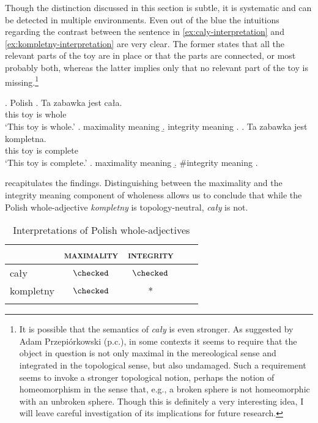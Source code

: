 Though the distinction discussed in this section is subtle, it is systematic and can be detected in multiple environments. Even out of the blue the intuitions regarding the contrast between the sentence in \ref{ex:caly-interpretation} and \ref{ex:kompletny-interpretation} are very clear. The former states that all the relevant parts of the toy are in place or that the parts are connected, or most probably both, whereas the latter implies only that no relevant part of the toy is missing.\footnote{It is possible that the semantics of \textit{cały} is even stronger. As suggested by Adam Przepiórkowski (p.c.), in some contexts it seems to require that the object in question is not only maximal in the mereological sense and integrated in the topological sense, but also undamaged. Such a requirement seems to invoke a stronger topological notion, perhaps the notion of homeomorphism in the sense that, e.g., a broken sphere is not homeomorphic with an unbroken sphere. Though this is definitely a very interesting idea, I will leave careful investigation of its implications for future research.}\largerpage
		
		\ex. Polish\label{ex:caly-kompletny-interpretation}
        \ag. Ta zabawka jest cała.\label{ex:caly-interpretation}\\
		this toy is whole\\
		`This toy is whole.'
		\a. maximality meaning
		\b. integrity meaning
		\z.
		\bg. Ta zabawka jest kompletna.\label{ex:kompletny-interpretation}\\
		this toy is complete\\
		`This toy is complete.'
		\a. maximality meaning
		\b. \#integrity meaning
        \z.

 recapitulates the findings. Distinguishing between the maximality and the integrity meaning component of wholeness allows us to conclude that while the Polish whole-adjective \textit{kompletny} is topology-neutral, \textit{cały} is not.  

		\begin{table}[h]
			\centering
			\begin{tabular}{lcccc}
				\lsptoprule
				& \textsc{maximality} & \textsc{integrity} \\ \midrule
				cały  & $\checked$    & $\checked$  \\
				kompletny & $\checked$   & * \\ \lspbottomrule
			\end{tabular}
			\caption{Interpretations of Polish whole-adjectives}
            \label{tab:interpretations-of-polish-whole-adjectives}
		\end{table}

